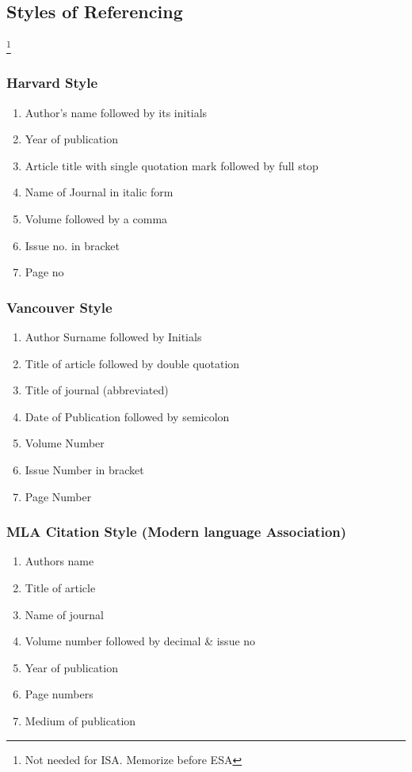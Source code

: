 \documentclass{article}
\begin{document}
\subsection{Styles of Referencing}

\footnote{Not needed for ISA. Memorize before ESA}

\subsubsection{Harvard Style}

\begin{enumerate}
    \item Author’s name followed by its initials
    \item Year of publication
    \item Article title with single quotation mark followed by full stop
    \item Name of Journal in italic form
    \item Volume followed by a comma
    \item Issue no. in bracket
    \item Page no
\end{enumerate}

\subsubsection{Vancouver Style}

\begin{enumerate}
    \item Author Surname followed by Initials
    \item Title of article followed by double quotation
    \item Title of journal (abbreviated)
    \item Date of Publication followed by semicolon
    \item Volume Number
    \item Issue Number in bracket
    \item Page Number
\end{enumerate}

\subsubsection{MLA Citation Style (Modern language Association)}

\begin{enumerate}
    \item Authors name
    \item Title of article
    \item Name of journal
    \item Volume number followed by decimal & issue no
    \item Year of publication
    \item Page numbers
    \item Medium of publication
\end{enumerate}
\end{document}
